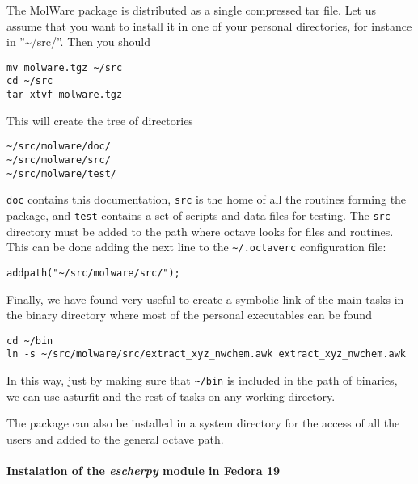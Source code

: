 \documentclass[a4paper]{article}
\begin{document}
The MolWare package is distributed as a single compressed tar file. Let
us assume that you want to install it in one of your personal
directories, for instance in ''\textasciitilde{}/src/''. Then you should
%
\asciilist
\begin{lstlisting}
mv molware.tgz ~/src
cd ~/src
tar xtvf molware.tgz
\end{lstlisting}

This will create the tree of directories
%
\asciilist
\begin{lstlisting}
~/src/molware/doc/
~/src/molware/src/
~/src/molware/test/
\end{lstlisting}

\texttt{doc} contains this documentation, \texttt{src} is the home of all the
routines forming the package, and \texttt{test} contains a set of scripts and
data files for testing. The \texttt{src} directory must be added to the path
where octave looks for files and routines. This can be done adding the
next line to the \texttt{\textasciitilde{}/.octaverc} configuration file:
%
\asciilist
\begin{lstlisting}
addpath("~/src/molware/src/");
\end{lstlisting}

Finally, we have found very useful to create a symbolic link of the main
tasks in the binary directory where most of the personal executables can
be found
%
\asciilist
\begin{lstlisting}
cd ~/bin
ln -s ~/src/molware/src/extract_xyz_nwchem.awk extract_xyz_nwchem.awk
\end{lstlisting}

In this way, just by making sure that \texttt{\textasciitilde{}/bin} is included in the path
of binaries, we can use asturfit and the rest of tasks on any working
directory.

The package can also be installed in a system directory for the access
of all the users and added to the general octave path.


\paragraph{Instalation of the \emph{escherpy} module in Fedora 19%
  \label{instalation-of-the-escherpy-module-in-fedora-19}%
}
\end{document}
